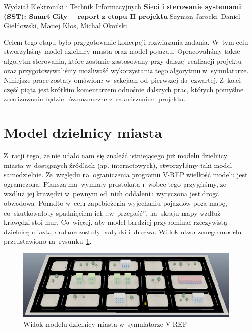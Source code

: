 \documentclass[11pt, a4paper, twoside]{article}
\begin{document}
	
	\begin{center} 
		{\Large Wydział Elektroniki i Technik Informacyjnych}
		\vskip0.2cm
		{\LARGE \textbf{Sieci i sterowanie systemami (SST): Smart City --~raport z etapu II projektu  } } 
		\vskip0.3cm
		{\Large Szymon Jarocki, Daniel Giełdowski, Maciej Kłos, Michał Okoński}
		\vskip0.8cm
	\end{center} 	
	
	Celem tego etapu było przygotowanie koncepcji rozwiązania zadania. W~tym celu stworzyliśmy model dzielnicy miasta oraz model pojazdu. Opracowaliśmy także algorytm sterowania, które zostanie zastosowany przy dalszej realizacji projektu oraz przygotowywaliśmy możliwość wykorzystania tego algorytmu w~symulatorze. Niniejsze prace zostały omówione w~sekcjach od~pierwszej do~czwartej. Z~kolei część piąta jest krótkim komentarzem odnośnie dalszych prac, których pomyślne zrealizowanie będzie równoznaczne z~zakończeniem projektu. 
	\section{Model dzielnicy miasta}
	Z~racji tego, że nie udało nam się znaleźć istniejącego już modelu dzielnicy miasta w~dostępnych źródłach (np. internetowych), stworzyliśmy taki model samodzielnie. Ze~względu na~ograniczenia programu V-REP wielkość modelu jest ograniczona. Plansza ma~wymiary prostokąta i~wobec tego przyjęliśmy, że wzdłuż jej krawędzi w~pewnym od~nich oddaleniu wytyczona jest droga obwodowa. Ponadto w~celu zapobieżenia wyjechaniu pojazdów poza mapę, co~skutkowałoby spadnięciem ich ,,w~przepaść'', na~skraju mapy wzdłuż krawędzi stoi mur. Co~więcej, aby model bardziej przypominał rzeczywistą dzielnicę miasta, dodane zostały budynki i~drzewa. Widok utworzonego modelu przedstawiono na~rysunku~\ref{fig:district}. 
	\begin{figure}[!h]
		\centering
		\includegraphics[width=.95\linewidth]{cityDistrict}
		\caption{Widok modelu dzielnicy miasta w~symulatorze V-REP}
		\label{fig:district}
	\end{figure}
	
\end{document}
